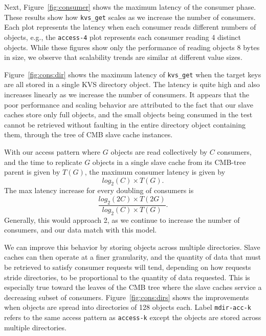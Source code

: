 Next, Figure~\ref{fig:consumer} shows the maximum latency of the consumer
phase. %
These results show how {\tt kvs\_get}
scales as we increase the number of consumers. Each plot represents
the latency when each consumer reads different numbers of 
objects, e.g., the {\tt access-4} plot represents each consumer reading
4 distinct objects.  While these figures show only the performance of reading
objects 8 bytes in size, we observe that 
scalability trends are similar at different value sizes.

Figure~\ref{fig:cons:dir} shows the maximum latency of {\tt kvs\_get}
when the target keys are all stored in a single
KVS directory object. The latency is quite high and also increases
linearly as we increase the number of consumers. 
It appears that the poor performance and scaling behavior 
are attributed to the fact that our slave caches store only full
objects, and the small objects being consumed in the test cannot
be retrieved without faulting in the entire directory object
containing them, through the tree of CMB slave cache instances.

With our access pattern where $G$ objects are read collectively by
$C$ consumers, and the time to replicate $G$ objects in a single slave cache
from its CMB-tree parent is given by $T(G)$, the maximum consumer latency is given by
\begin{equation}
log_2(C) \times T(G).
\end{equation}
The max latency increase for every doubling of consumers is
\begin{equation}
\frac{log_2(2C) \times T(2G)}{log_2(C) \times T(G)}.
\end{equation}
Generally, this would approach 2, 
as we continue to increase the number of consumers,
and our data match with this model.

We can improve this behavior by storing objects across multiple
directories. Slave caches can then operate at a finer granularity,
and the quantity of data that must be retrieved to satisfy consumer
requests will tend, depending on how requests stride directories,
to be proportional to the quantity of data requested.
This is especially true toward the leaves of the CMB tree where the
slave caches service a decreasing subset of consumers.
Figure~\ref{fig:cons:dirs} shows the improvements 
when objects are spread into directories of 128 objects each.
Label {\tt mdir-acc-k} refers to the same access pattern as {\tt access-k} 
except the objects are stored across multiple directories.

